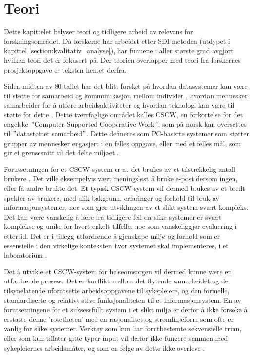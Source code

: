 \chapter{Teori}
\label{chp:teori} 

Dette kapittelet belyser teori og tidligere arbeid av relevans for forskningsområdet. Da forskerne har arbeidet etter SDI-metoden (utdypet i kapittel \ref{section:kvalitativ_analyse}), har funnene i aller største grad avgjort hvilken teori det er fokusert på. Der teorien overlapper med teori fra forskernes prosjektoppgave \citep{Sund13} er teksten hentet derfra. 

\noindent
Siden midten av 80-tallet har det blitt forsket på hvordan datasystemer kan være til støtte for samarbeid og kommunikasjon mellom individer \citep{Rogers94}, hvordan mennesker samarbeider for å utføre arbeidsaktiviteter og hvordan teknologi kan være til støtte for dette \citep{Ellis91}. Dette tverrfaglige området kalles CSCW, en forkortelse for det engelske $"$Computer-Supported Cooperative Work$"$, som på norsk kan oversettes til $"$datastøttet samarbeid$"$. Dette defineres som PC-baserte systemer som støtter grupper av mennesker engasjert i en felles oppgave, eller med et felles mål, som gir et grensesnitt til det delte miljøet \citep{Ellis91}.

\noindent
Forutsetningen for et CSCW-system er at det brukes av et tilstrekkelig antall brukere \citep{Ackermann00}. Det ville eksempelvis vært meningsløst å bruke e-post dersom ingen, eller få andre brukte det. Et typisk CSCW-system vil dermed brukes av et bredt spekter av brukere, med ulik bakgrunn, erfaringer og forhold til bruk av informasjonsystemer, noe som gjør utviklingen av et slikt system svært kompleks. Det kan være vanskelig å lære fra tidligere feil da slike systemer er svært komplekse og unike for hvert enkelt tilfelle, noe som vanskeliggjør evaluering i ettertid. Det er i tillegg utfordrende å gjenskape miljø og forhold som er essensielle i den virkelige konteksten hvor systemet skal implementeres, i et laboratorium \citep{Berg99}.

\noindent
Det å utvikle et CSCW-system for helseomsorgen vil dermed kunne være en utfordrende prosess. Det er konflikt mellom det flytende samarbeidet og de tilsynelatende uforutsette arbeidsoppgavene til sykepleiere, og den formelle, standardiserte og relativt stive funksjonaliteten til et informasjonsystem. En av forutsetningene for et suksessfullt system i et slikt miljø er derfor å ikke forsøke å erstatte denne 'rotetheten' med en rasjonalitet og strømlinjeform som ofte er vanlig for slike systemer. Verktøy som kun har forutbestemte sekvensielle trinn, eller som kun tillater gitte typer input vil derfor ikke fungere sammen med sykepleiernes arbeidsmåter, og som en følge av dette ikke overleve \citep{Berg99}.
